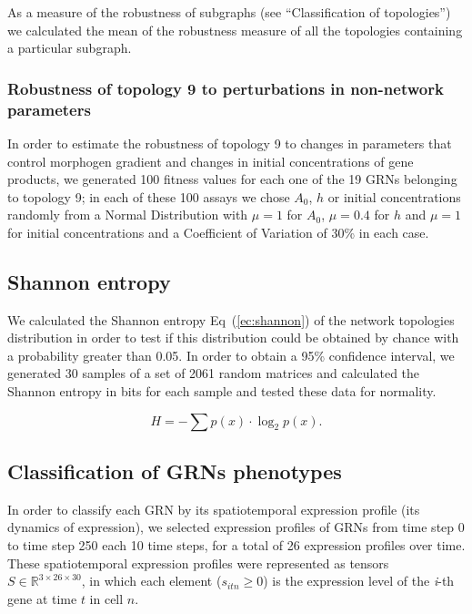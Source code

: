 \documentclass[10pt,letterpaper]{article}
\begin{document}
As a measure of the robustness of subgraphs (see “Classification of topologies”)
we calculated the mean of the robustness measure of all the topologies 
containing a particular subgraph.\\

\subsubsection*{Robustness of topology 9 to perturbations in non-network parameters}

In order to estimate the robustness of topology 9 to changes in parameters that 
control morphogen gradient and changes in initial concentrations of gene 
products, we generated 100 fitness values for each one of the 19 GRNs 
belonging to topology 9; in each of these 100 assays we chose $A_0$, $h$ or 
initial concentrations randomly from a Normal Distribution with $\mu = 1$ for 
$A_0$, $\mu = 0.4$ for $h$ and $\mu = 1$ for initial concentrations and a 
Coefficient of Variation of 30\% in each case.

\subsection*{Shannon entropy}

We calculated the Shannon entropy Eq~(\ref{ec:shannon}) of the network 
topologies distribution in order to test if this distribution could be obtained 
by chance with a probability greater than 0.05. In order to obtain a 95\% 
confidence interval, we generated 30 samples of a set of 2061 random matrices 
and calculated the Shannon entropy in bits for each sample and tested these data
for normality.

\begin{equation}
 H = -\sum p(x) \cdot \log_{2}p(x).
 \label{ec:shannon}
\end{equation}

\subsection*{Classification of GRNs phenotypes}

In order to classify each GRN by its spatiotemporal expression profile (its 
dynamics of expression), we selected expression profiles of GRNs from time step 
0 to time step 250 each 10 time steps, for a total of 26 expression profiles 
over time. These spatiotemporal expression profiles were represented as tensors 
$S \in \mathbb{R}^{3 \times 26 \times 30}$, in which each element ($s_{itn} \geq
0$) is the expression level of the \emph{i}-th gene at time $t$ in cell $n$.\\
\end{document}
